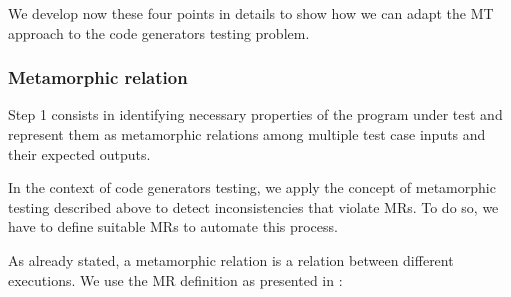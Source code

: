 We develop now these four points in details to show how we can adapt the MT approach to the code generators testing problem. 
\subsubsection[(Step 1)]{Metamorphic relation }

Step 1 consists in identifying necessary properties of the program under test and represent them as metamorphic relations among multiple test case inputs and their expected outputs.

In the context of code generators testing, we apply the concept of metamorphic testing described above to detect inconsistencies that violate MRs.
To do so, we have to define suitable MRs to automate this process.

As already stated, a metamorphic relation is a relation between different executions.
We use the MR definition as presented in \cite{tao2010automatic,chan2006integration}:

